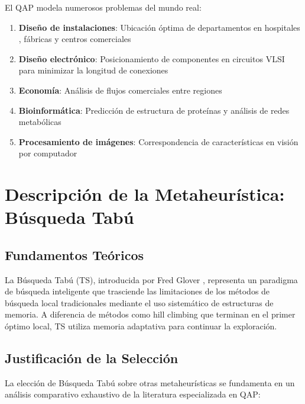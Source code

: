 \documentclass[12pt, a4paper]{article}
\begin{document}
El QAP modela numerosos problemas del mundo real:

\begin{enumerate}
    \item \textbf{Diseño de instalaciones}: Ubicación óptima de departamentos en hospitales \cite{elshafei1977}, fábricas \cite{taillard1995} y centros comerciales
    \item \textbf{Diseño electrónico}: Posicionamiento de componentes en circuitos VLSI para minimizar la longitud de conexiones \cite{steinberg1961}
    \item \textbf{Economía}: Análisis de flujos comerciales entre regiones \cite{krarup1978}
    \item \textbf{Bioinformática}: Predicción de estructura de proteínas y análisis de redes metabólicas \cite{phillips2000}
    \item \textbf{Procesamiento de imágenes}: Correspondencia de características en visión por computador \cite{maciel2003}
\end{enumerate}

\newpage

\section{Descripción de la Metaheurística: Búsqueda Tabú}

\subsection{Fundamentos Teóricos}

La Búsqueda Tabú (TS), introducida por Fred Glover \cite{glover1989, glover1990}, representa un paradigma de búsqueda inteligente que trasciende las limitaciones de los métodos de búsqueda local tradicionales mediante el uso sistemático de estructuras de memoria. A diferencia de métodos como hill climbing que terminan en el primer óptimo local, TS utiliza memoria adaptativa para continuar la exploración.

\subsection{Justificación de la Selección}

La elección de Búsqueda Tabú sobre otras metaheurísticas se fundamenta en un análisis comparativo exhaustivo de la literatura especializada en QAP:
\end{document}
